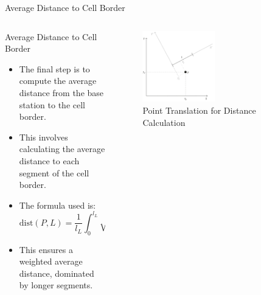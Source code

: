 \begin{frame}{Average Distance to Cell Border}
    \begin{columns}
        \begin{column}{0.55\textwidth}
            \begin{block}{Average Distance to Cell Border}
                    \begin{itemize}
                        \item The final step is to compute the average distance from the base station to the cell border.
                        \item This involves calculating the average distance to each segment of the cell border.
                        \item The formula used is:
                        \begin{equation}
                            \text{dist}(P, L) = \frac{1}{l_L} \int_0^{l_L} \sqrt{(x' - x_P')^2 + y_P'^2} \, dx'
                        \end{equation}
                        \item This ensures a weighted average distance, dominated by longer segments.
                    \end{itemize}
            \end{block}
        \end{column}
        \begin{column}{0.6\textwidth}
            \begin{figure}
                \includegraphics[width=0.5\textwidth]{images/Altair/Voronoi_appr/Point_transl.png}  %
                \caption{Point Translation for Distance Calculation}
            \end{figure}
        \end{column}
    \end{columns}
\end{frame}



